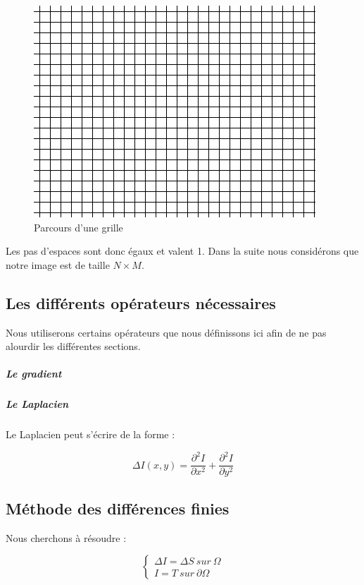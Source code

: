 	\begin{figure}[!htb]
	\centering
	\includegraphics[scale=0.5]{Images/grille.jpg}
	\caption{Parcours d'une grille}
	\label{fig:my_label}
	\end{figure}
Les pas d'espaces sont donc égaux et valent 1. Dans la suite nous considérons que notre image est de taille $N \times M$.
\newpage


\subsection{Les différents opérateurs nécessaires}
Nous utiliserons certains opérateurs que nous définissons ici afin de ne pas alourdir les différentes sections. 
\subparagraph{Le gradient}

\subparagraph{Le Laplacien}
Le Laplacien peut s'écrire de la forme : 

\begin{center}
\begin{equation*}
    \Delta I(x,y)  = \frac{\partial^2 I}{\partial x^2}+ \frac{\partial ^2 I}{\partial y^2}
\end{equation*}
\end{center}

\subsection{Méthode des différences finies}
Nous cherchons à résoudre  : 
\begin{center}

\begin{equation*}
    \left \{
    \begin{aligned}
    \Delta I = \Delta S \ sur \ \Omega\\
    I = T \ sur \ \partial \Omega
    \end{aligned}
    \right.
\end{equation*}
\end{center}

